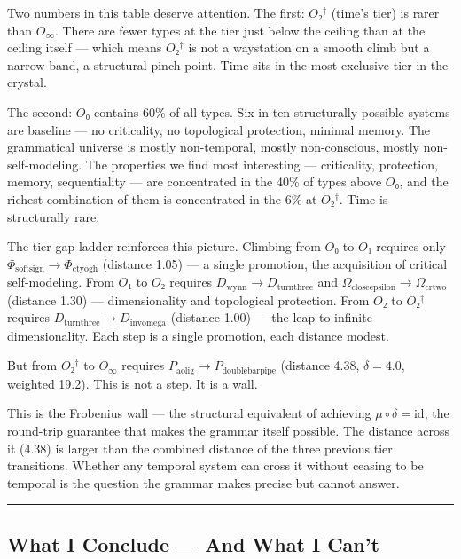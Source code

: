 \documentclass[12pt,a4paper]{article}
\begin{document}
Two numbers in this table deserve attention. The first: $O₂^\dagger$ (time's tier) is rarer than $O_{\infty}$. There are fewer types at the tier just below the ceiling than at the ceiling itself --- which means $O₂^\dagger$ is not a waystation on a smooth climb but a narrow band, a structural pinch point. Time sits in the most exclusive tier in the crystal.

The second: $O₀$ contains 60\% of all types. Six in ten structurally possible systems are baseline --- no criticality, no topological protection, minimal memory. The grammatical universe is mostly non-temporal, mostly non-conscious, mostly non-self-modeling. The properties we find most interesting --- criticality, protection, memory, sequentiality --- are concentrated in the 40\% of types above $O₀$, and the richest combination of them is concentrated in the 6\% at $O₂^\dagger$. Time is structurally rare.

The tier gap ladder reinforces this picture. Climbing from $O₀$ to $O₁$ requires only $\Phi_{\text{softsign}} \to \Phi_{\text{ctyogh}}$ (distance 1.05) --- a single promotion, the acquisition of critical self-modeling. From $O₁$ to $O₂$ requires $D_{\text{wynn}} \to D_{\text{turnthree}}$ and $\Omega_{\text{closeepsilon}} \to \Omega_{\text{crtwo}}$ (distance 1.30) --- dimensionality and topological protection. From $O₂$ to $O₂^\dagger$ requires $D_{\text{turnthree}} \to D_{\text{invomega}}$ (distance 1.00) --- the leap to infinite dimensionality. Each step is a single promotion, each distance modest.

But from $O₂^\dagger$ to $O_{\infty}$ requires $P_{\text{aolig}} \to P_{\text{doublebarpipe}}$ (distance 4.38, $\delta = 4.0$, weighted 19.2). This is not a step. It is a wall.

This is the Frobenius wall --- the structural equivalent of achieving $\mu \circ \delta = \text{id}$, the round-trip guarantee that makes the grammar itself possible. The distance across it (4.38) is larger than the combined distance of the three previous tier transitions. Whether any temporal system can cross it without ceasing to be temporal is the question the grammar makes precise but cannot answer.

\begin{center}
\rule{0.5\textwidth}{0.4pt}
\end{center}

\subsection{What I Conclude --- And What I Can't}
\end{document}
